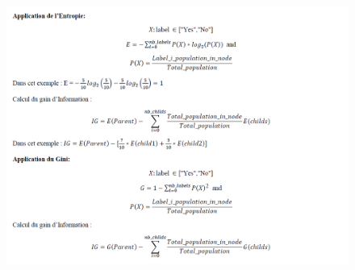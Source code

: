 \begin{figure}[h]
\begin{center}
\includegraphics[width=15cm,height=12cm]{images/decision_tree_equation.png}
\label{monlabel}
\end{center}
\end{figure}
\newpage

